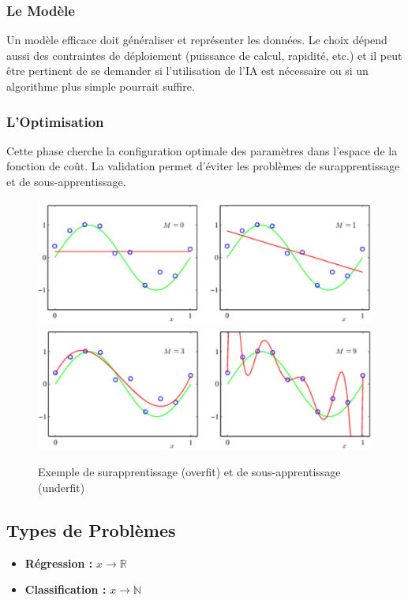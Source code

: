 \documentclass{article}
\begin{document}
\subsubsection{Le Modèle}
Un modèle efficace doit généraliser et représenter les données. Le choix dépend aussi des contraintes de déploiement (puissance de calcul, rapidité, etc.) et il peut être pertinent de se demander si l'utilisation de l'IA est nécessaire ou si un algorithme plus simple pourrait suffire.

\subsubsection{L’Optimisation}
Cette phase cherche la configuration optimale des paramètres dans l’espace de la fonction de coût. La validation permet d’éviter les problèmes de surapprentissage et de sous-apprentissage.

\begin{figure}[ht]
    \centering
    \includegraphics[width=\linewidth]{graphics/sous-apprentissage.PNG}
    \includegraphics[width=\linewidth]{graphics/sur-apprentissage.PNG}
    \caption{Exemple de surapprentissage (overfit) et de sous-apprentissage (underfit)}
    \label{fig:over-under-fit}
\end{figure}

\subsection{Types de Problèmes}

\begin{itemize}
    \item \textbf{Régression :} \(x \xrightarrow{} \mathbb{R}\)
    \item \textbf{Classification :} \(x \xrightarrow{} \mathbb{N}\)
\end{itemize}
\end{document}
